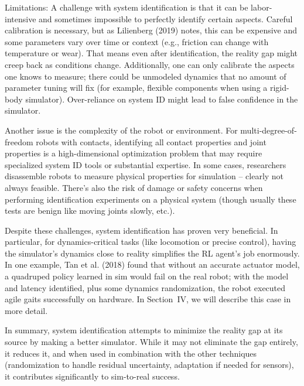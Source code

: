 Limitations: A challenge with system identification is that it can be labor-intensive and sometimes impossible to perfectly identify certain aspects. Careful calibration is necessary, but as Lilienberg (2019) notes, this can be expensive and some parameters vary over time or context (e.g., friction can change with temperature or wear). That means even after identification, the reality gap might creep back as conditions change. Additionally, one can only calibrate the aspects one knows to measure; there could be unmodeled dynamics that no amount of parameter tuning will fix (for example, flexible components when using a rigid-body simulator). Over-reliance on system ID might lead to false confidence in the simulator. 

Another issue is the complexity of the robot or environment. For multi-degree-of-freedom robots with contacts, identifying all contact properties and joint properties is a high-dimensional optimization problem that may require specialized system ID tools or substantial expertise. In some cases, researchers disassemble robots to measure physical properties for simulation – clearly not always feasible. There’s also the risk of damage or safety concerns when performing identification experiments on a physical system (though usually these tests are benign like moving joints slowly, etc.). 

Despite these challenges, system identification has proven very beneficial. In particular, for dynamics-critical tasks (like locomotion or precise control), having the simulator’s dynamics close to reality simplifies the RL agent’s job enormously. In one example, Tan et al. (2018) found that without an accurate actuator model, a quadruped policy learned in sim would fail on the real robot; with the model and latency identified, plus some dynamics randomization, the robot executed agile gaits successfully on hardware. In Section IV, we will describe this case in more detail. 

In summary, system identification attempts to minimize the reality gap at its source by making a better simulator. While it may not eliminate the gap entirely, it reduces it, and when used in combination with the other techniques (randomization to handle residual uncertainty, adaptation if needed for sensors), it contributes significantly to sim-to-real success.
